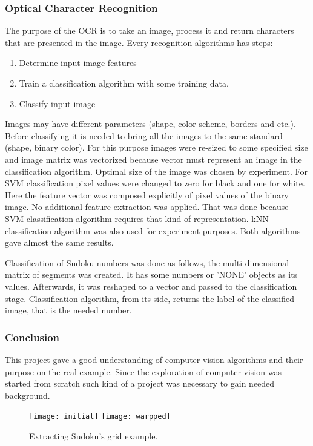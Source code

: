 \documentclass[../../main]{subfiles}
\begin{document}
\subsubsection{Optical Character Recognition}

The purpose of the OCR is to take an image, process it and return characters that are presented in the image.
Every recognition algorithms has steps:
\begin{enumerate}
\item  Determine input image features
\item  Train a classification algorithm with some training data.
\item  Classify input image
\end{enumerate}

Images may have different parameters (shape, color scheme, borders and etc.). Before classifying it is needed to bring all the images to the same standard (shape, binary color). For this purpose images were re-sized to some specified size and image matrix was vectorized because vector must represent an image in the classification algorithm. Optimal size of the image was chosen by experiment. For \ac{SVM} classification pixel values were changed to zero for black and one for white. Here the feature vector was composed explicitly of pixel values of the binary image. No additional feature extraction was applied. That was done because \ac{SVM} classification algorithm requires that kind of representation. \ac{kNN} classification algorithm was also used for experiment purposes.
Both algorithms gave almost the same results.

Classification of Sudoku numbers was done as follows, the multi-dimensional matrix of segments was created. It has some numbers or 'NONE' objects as its values. Afterwards, it was reshaped to a vector and passed to the classification stage. Classification algorithm, from its side, returns the label of the classified image, that is the needed number.

\subsubsection{Conclusion}

This project gave a good understanding of computer vision algorithms and their purpose on the real example. Since the exploration of computer vision was started from scratch such kind of a project was necessary to gain needed background. 

\begin{figure} [ht!]
    \begin{center}
        \texttt{[image: initial]}
        \texttt{[image: warpped]}
        \caption{Extracting Sudoku's grid example.}
        \label{fig:sudoku_extraction}
    \end{center}
\end{figure}
\end{document}
